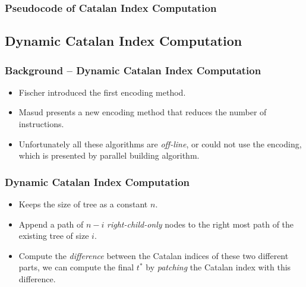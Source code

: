 \begin{withoutheadline}
\begin{frame}
	\frametitle{Pseudocode of Catalan Index Computation}
	\begin{center}
		\scalebox{0.7} { \begin{minipage}{\textwidth}
			
			\end{minipage}
		}
	\end{center}
\end{frame}
\end{withoutheadline}

\subsection{Dynamic Catalan Index Computation}
\begin{frame}
	\frametitle{Background -- Dynamic Catalan Index Computation}
	\begin{itemize}
		\setlength\itemsep{1em}
	 	\item 
	 		Fischer introduced the first encoding method.
		\item
			Masud presents a new encoding method that reduces the number
			of instructions.
		\item 
			Unfortunately all these algorithms are {\em off-line}, or
			could not use the encoding, which is presented by parallel
			building algorithm.
	\end{itemize}
\end{frame}

\begin{frame}
	\frametitle{Dynamic Catalan Index Computation}
	\begin{itemize}
		\setlength\itemsep{1em}
	 	\item 
	 		Keeps the size of tree as a constant $n$.
	 	\item
	 		Append a path of $n-i$ {\em right-child-only} nodes to the
			right most path of the existing tree of size $i$.
		\item
			Compute the {\em difference} between the Catalan indices of
			these two different parts, we can compute the final $t^*$ by
			{\em patching} the Catalan index with this difference.
	\end{itemize}
\end{frame}


